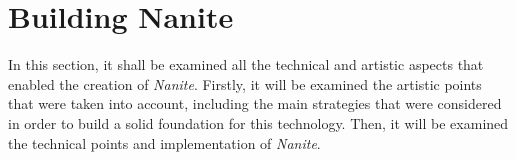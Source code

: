 \documentclass[10pt,journal,compsoc]{IEEEtran}
\begin{document}





\section{Building Nanite}\label{sec:3}

\par In this section, it shall be examined all the technical and artistic aspects that enabled the creation of \textit{Nanite}. Firstly, it will be examined the artistic points that were taken into account, including the main strategies that were considered in order to build a solid foundation for this technology. Then, it will be examined the technical points and implementation of \textit{Nanite}.
\end{document}
